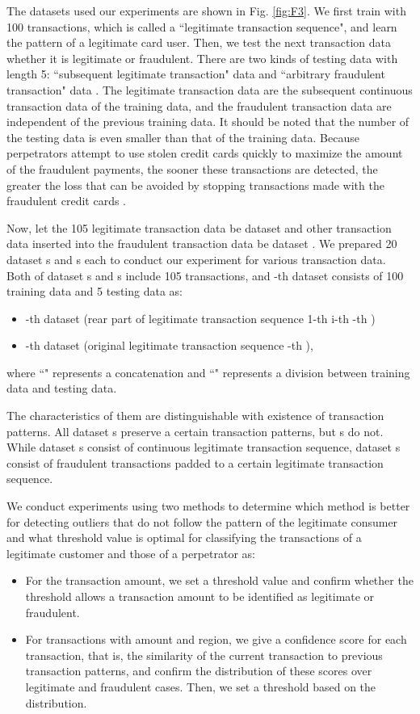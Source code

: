 \documentclass[final,authoryear,5p,times,twocolumn]{elsarticle}
\begin{document}
The datasets used our experiments are shown in Fig. \ref{fig:F3}. We first train with 100 transactions, which is called a ``legitimate transaction sequence", and learn the pattern of a legitimate card user. Then, we test the next transaction data whether it is legitimate or fraudulent. There are two kinds of testing data with length 5: ``subsequent legitimate transaction" data  and ``arbitrary fraudulent transaction" data . The legitimate transaction data  are the subsequent continuous transaction data of the training data, and the fraudulent transaction data  are independent of the previous training data. It should be noted that the number of the testing data is even smaller than that of the training data. Because perpetrators attempt to use stolen credit cards quickly to maximize the amount of the fraudulent payments, the sooner these transactions are detected, the greater the loss that can be avoided by stopping transactions made with the fraudulent credit cards \citep{ref3}.

Now, let the 105 legitimate transaction data be dataset  and other transaction data inserted into the fraudulent transaction data be dataset . We prepared 20 dataset s and s each to conduct our experiment for various transaction data. Both of dataset s and s include 105 transactions, and -th dataset consists of 100 training data and 5 testing data as:
\begin{itemize}
\item -th dataset  (rear part of legitimate transaction sequence  1-th     i-th   -th )
\item -th dataset  (original legitimate transaction sequence  -th ),
\end{itemize}
where ``" represents a concatenation and ``" represents a division between training data and testing data.

The characteristics of them are distinguishable with existence of transaction patterns. All dataset s preserve a certain transaction patterns, but s do not. While dataset s consist of continuous legitimate transaction sequence, dataset s consist of fraudulent transactions padded to a certain legitimate transaction sequence.

We conduct experiments using two methods to determine which method is better for detecting outliers that do not follow the pattern of the legitimate consumer and what threshold value is optimal for classifying the transactions of a legitimate customer and those of a perpetrator as:
\begin{itemize}
\item For the transaction amount, we set a threshold value and confirm whether the threshold allows a transaction amount to be identified as legitimate or fraudulent.
\item For transactions with amount and region, we give a confidence score for each transaction, that is, the similarity of the current transaction to previous transaction patterns, and confirm the distribution of these scores over legitimate and fraudulent cases. Then, we set a threshold based on the distribution.
\end{itemize}
\end{document}
